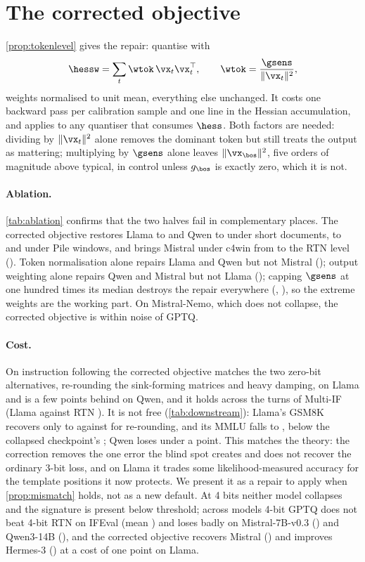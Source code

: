 \section{The corrected objective}
\label{sec:corrected}
\cref{prop:tokenlevel} gives the repair: quantise with
\begin{equation}
\label{eq:corrected}
\hessw=\sum_t \wtok\,\vx_t\vx_t^\top,\qquad \wtok=\frac{\gsens}{\|\vx_t\|^2},
\end{equation}
weights normalised to unit mean, everything else unchanged.
It costs one backward pass per calibration sample and one line in the Hessian accumulation, and applies to any quantiser that consumes $\hess$.
Both factors are needed: dividing by $\|\vx_t\|^2$ alone removes the dominant token but still treats the \bos{} output as mattering; multiplying by $\gsens$ alone leaves $\|\vx_{\bos}\|^2$, five orders of magnitude above typical, in control unless $g_{\bos}$ is exactly zero, which it is not.

\paragraph{Ablation.}
\cref{tab:ablation} confirms that the two halves fail in complementary places.
The corrected objective restores Llama to \LcorrIF{} and Qwen to \QcorrIF{} under short documents, to \LpileCorrIF{} and \QpileCorrIF{} under Pile windows, and brings Mistral under c4win from \MgptqIF{} to the RTN level (\McorrIF{}).
Token normalisation alone repairs Llama and Qwen but not Mistral (\MtnormIF{}); output weighting alone repairs Qwen and Mistral but not Llama (\LgonlyIF{}); capping $\gsens$ at one hundred times its median destroys the repair everywhere (\LcapIF{}, \QcapIF{}), so the extreme weights are the working part.
On Mistral-Nemo, which does not collapse, the corrected objective is within noise of GPTQ.


\paragraph{Cost.}
On instruction following the corrected objective matches the two zero-bit alternatives, re-rounding the sink-forming matrices and heavy damping, on Llama and is a few points behind on Qwen, and it holds across the turns of Multi-IF (Llama \LcorrMIF{} against RTN \LrtnMIF{}).
It is not free (\cref{tab:downstream}): Llama's GSM8K recovers only to \LcorrGSM{} against \LzeroBitGSM{} for re-rounding, and its MMLU falls to \LcorrMMLU{}, below the collapsed checkpoint's \LgptqMMLU{}; Qwen loses under a point.
This matches the theory: the correction removes the one error the blind spot creates and does not recover the ordinary 3-bit loss, and on Llama it trades some likelihood-measured accuracy for the template positions it now protects.
We present it as a repair to apply when \cref{prop:mismatch} holds, not as a new default.
At 4 bits neither model collapses and the signature is present below threshold; across \nFour{} models 4-bit GPTQ does not beat 4-bit RTN on IFEval (mean \FourMeanDelta{}) and loses badly on Mistral-7B-v0.3 (\FourMistral{}) and Qwen3-14B (\FourQwenThree{}), and the corrected objective recovers Mistral (\CorrFourMistral{}) and improves Hermes-3 (\CorrFourHermes{}) at a cost of one point on Llama.
